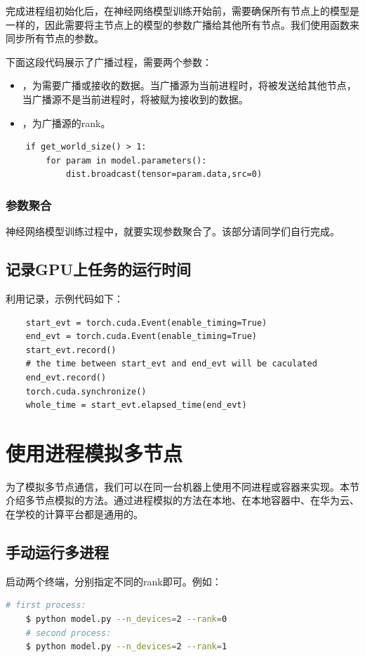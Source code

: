 完成进程组初始化后，在神经网络模型训练开始前，需要确保所有节点上的模型是一样的，因此需要将主节点上的模型的参数广播给其他所有节点。我们使用函数来同步所有节点的参数。

下面这段代码展示了广播过程，需要两个参数：
\begin{itemize}
    \item {}，为需要广播或接收的数据。当广播源为当前进程时，将被发送给其他节点，当广播源不是当前进程时，将被赋为接收到的数据。
    \item {}，为广播源的rank。
\end{itemize}

\begin{lstlisting}
    if get_world_size() > 1:
        for param in model.parameters():
            dist.broadcast(tensor=param.data,src=0)
\end{lstlisting}

\subsubsection{参数聚合}

神经网络模型训练过程中，就要实现参数聚合了。该部分请同学们自行完成。

\subsection{记录GPU上任务的运行时间}

利用记录，示例代码如下：
\begin{lstlisting}
    start_evt = torch.cuda.Event(enable_timing=True)
    end_evt = torch.cuda.Event(enable_timing=True)
    start_evt.record()
    # the time between start_evt and end_evt will be caculated
    end_evt.record()
    torch.cuda.synchronize()
    whole_time = start_evt.elapsed_time(end_evt)
\end{lstlisting}

\section{使用进程模拟多节点}

为了模拟多节点通信，我们可以在同一台机器上使用不同进程或容器来实现。本节介绍多节点模拟的方法。通过进程模拟的方法在本地、在本地容器中、在华为云、在学校的计算平台都是通用的。

\subsection{手动运行多进程}
启动两个终端，分别指定不同的rank即可。例如：
\begin{lstlisting}[language=bash]
    # first process:
    $ python model.py --n_devices=2 --rank=0
    # second process:
    $ python model.py --n_devices=2 --rank=1
\end{lstlisting}

